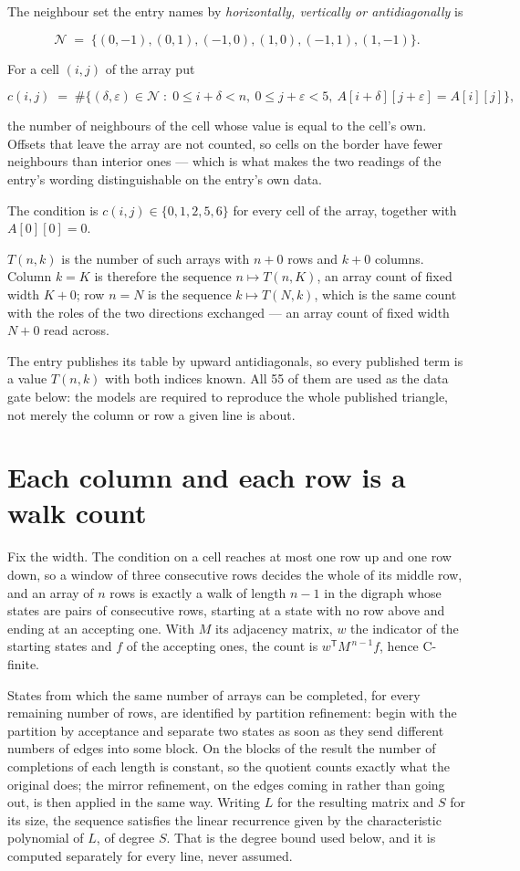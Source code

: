 \documentclass[11pt]{article}
\theoremstyle{definition}
\begin{document}
The neighbour set the entry names by {\itshape horizontally, vertically or antidiagonally} is

\[\mathcal{N} \;=\; \{(0,-1), (0,1), (-1,0), (1,0), (-1,1), (1,-1)\}.\]

For a cell $(i,j)$ of the array put

\[c(i,j) \;=\; \#\bigl\{(\delta,\varepsilon)\in\mathcal{N} \;:\; 0\le i+\delta<n,\ 0\le j+\varepsilon<5,\ A[i+\delta][j+\varepsilon] = A[i][j]\bigr\},\]

the number of neighbours of the cell whose value is equal to the cell's own. Offsets that leave the array are not counted, so cells on the border have fewer neighbours than interior ones --- which is what makes the two readings of the entry's wording distinguishable on the entry's own data.

The condition is $c(i,j) \in \{0, 1, 2, 5, 6\}$ for every cell of the array, together with $A[0][0]=0$.

$T(n,k)$ is the number of such arrays with $n + 0$ rows and $k + 0$ columns. Column $k = K$ is therefore the sequence $n \mapsto T(n,K)$, an array count of fixed width $K + 0$; row $n = N$ is the sequence $k \mapsto T(N,k)$, which is the same count with the roles of the two directions exchanged --- an array count of fixed width $N + 0$ read across.

The entry publishes its table by upward antidiagonals, so every published term is a value $T(n,k)$ with both indices known. All 55 of them are used as the data gate below: the models are required to reproduce the whole published triangle, not merely the column or row a given line is about.

\section{Each column and each row is a walk count}

Fix the width. The condition on a cell reaches at most one row up and one row down, so a window of three consecutive rows decides the whole of its middle row, and an array of $n$ rows is exactly a walk of length $n-1$ in the digraph whose states are pairs of consecutive rows, starting at a state with no row above and ending at an accepting one. With $M$ its adjacency matrix, $w$ the indicator of the starting states and $f$ of the accepting ones, the count is $w^{\mathsf T}M^{\,n-1}f$, hence C-finite.

States from which the same number of arrays can be completed, for every remaining number of rows, are identified by partition refinement: begin with the partition by acceptance and separate two states as soon as they send different numbers of edges into some block. On the blocks of the result the number of completions of each length is constant, so the quotient counts exactly what the original does; the mirror refinement, on the edges coming in rather than going out, is then applied in the same way. Writing $L$ for the resulting matrix and $S$ for its size, the sequence satisfies the linear recurrence given by the characteristic polynomial of $L$, of degree $S$. That is the degree bound used below, and it is computed separately for every line, never assumed.
\end{document}
